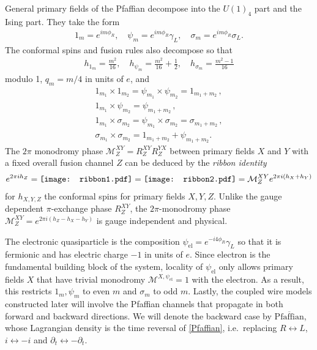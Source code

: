 General primary fields of the Pfaffian \CFT decompose into the $U(1)_4$ part and the Ising part. They take the form \begin{align}1_m=e^{im\phi_R},\quad\psi_m=e^{im\phi_R}\gamma_L,\quad\sigma_m=e^{im\phi_R}\sigma_L.\label{Pfaffianfields}\end{align} The conformal spins and fusion rules also decompose so that \begin{align}h_{1_m}=\frac{m^2}{16},\quad h_{\psi_m}=\frac{m^2}{16}+\frac{1}{2},\quad h_{\sigma_m}=\frac{m^2-1}{16}\end{align} modulo 1, $q_m=m/4$ in units of $e$, and \begin{gather}1_{m_1}\times1_{m_2}=\psi_{m_1}\times\psi_{m_2}=1_{m_1+m_2}\nonumber \,, \\1_{m_1}\times\psi_{m_2}=\psi_{m_1+m_2}\nonumber \,, \\1_{m_1}\times\sigma_{m_2}=\psi_{m_1}\times\sigma_{m_2}=\sigma_{m_1+m_2}\nonumber \,, \\\sigma_{m_1}\times\sigma_{m_2}=1_{m_1+m_2}+\psi_{m_1+m_2}.\end{gather} The $2\pi$ monodromy phase $\mathcal{M}^{XY}_Z=R^{XY}_ZR^{YX}_Z$ between primary fields $X$ and $Y$ with a fixed overall fusion channel $Z$ can be deduced by the {\em ribbon identity}~\cite{Kitaev06} \begin{align}e^{2\pi ih_Z}=\vcenter{\hbox{\texttt{[image: ribbon1.pdf]}}}=\vcenter{\hbox{\texttt{[image: ribbon2.pdf]}}}=\mathcal{M}^{XY}_Ze^{2\pi i(h_X+h_Y)}\label{ribbonapp}\end{align} for $h_{X,Y,Z}$ the conformal spins for primary fields $X,Y,Z$. Unlike the gauge dependent $\pi$-exchange phase $R^{XY}_Z$, the $2\pi$-monodromy phase $\mathcal{M}^{XY}_Z=e^{2\pi i(h_Z-h_X-h_Y)}$ is gauge independent and physical.

The electronic quasiparticle is the composition $\psi_{\mathrm{el}}=e^{-i4\phi_R}\gamma_L$ so that it is fermionic and has electric charge $-1$ in units of $e$. Since electron is the fundamental building block of the system, locality of $\psi_{\mathrm{el}}$ only allows primary fields $X$ that have trivial monodromy $\mathcal{M}^{X,\psi_{\mathrm{el}}}=1$ with the electron. As a result, this restricts $1_m,\psi_m$ to even $m$ and $\sigma_m$ to odd $m$. Lastly, the coupled wire models constructed later will involve the Pfaffian channels that propagate in both forward and backward directions. We will denote the backward case by $\overline{\mathrm{Pfaffian}}$, whose Lagrangian density is the time reversal of \eqref{Pfaffian}, i.e.~replacing $R\leftrightarrow L$, $i\leftrightarrow-i$ and $\partial_t\leftrightarrow-\partial_t$. 

